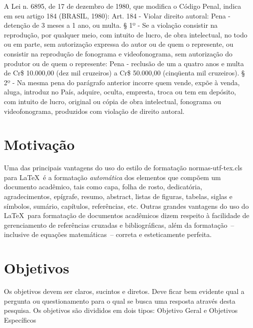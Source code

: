 A Lei n. 6895, de 17 de dezembro de 1980, que modifica o Código Penal, indica em seu artigo 184 (BRASIL, 1980):
Art. 184 - Violar direito autoral: 
Pena - detenção de 3 meses a 1 ano, ou multa.
§ 1º - Se a violação consistir na reprodução, por qualquer meio, com intuito de lucro, de obra intelectual, no todo ou em parte, sem autorização expressa do autor ou de quem o represente, ou consistir na reprodução de fonograma e videofonograma, sem autorização do produtor ou de quem o represente:
Pena - reclusão de um a quatro anos e multa de Cr\$ 10.000,00 (dez mil cruzeiros) a Cr\$ 50.000,00 (cinqüenta mil cruzeiros).
§ 2º - Na mesma pena do parágrafo anterior incorre quem vende, expõe à venda, aluga, introduz no País, adquire, oculta, empresta, troca ou tem em depósito, com intuito de lucro, original ou cópia de obra intelectual, fonograma ou videofonograma, produzidos com violação de direito autoral.

\section{Motiva\c{c}\~ao}

Uma das principais vantagens do uso do estilo de formata\c{c}\~ao {\ttfamily normas-utf-tex.cls} para \LaTeX\ \'e a formata\c{c}\~ao \textit{autom\'atica} dos elementos que comp\~oem um documento acad\^emico, tais como capa, folha de rosto, dedicat\'oria, agradecimentos, ep\'igrafe, resumo, abstract, listas de figuras, tabelas, siglas e s\'imbolos, sum\'ario, cap\'itulos, refer\^encias, etc. Outras grandes vantagens do uso do \LaTeX\ para formata\c{c}\~ao de documentos acad\^emicos dizem respeito \`a facilidade de gerenciamento de refer\^encias cruzadas e bibliogr\'aficas, al\'em da formata\c{c}\~ao~-- inclusive de equa\c{c}\~oes  matem\'aticas~-- correta e esteticamente perfeita.

\section{Objetivos}
Os objetivos devem ser claros, sucintos e diretos. Deve ficar bem evidente qual a pergunta ou questionamento para o qual se busca uma resposta através desta pesquisa. 
Os objetivos são divididos em dois tipos: Objetivo Geral e Objetivos Específicos

